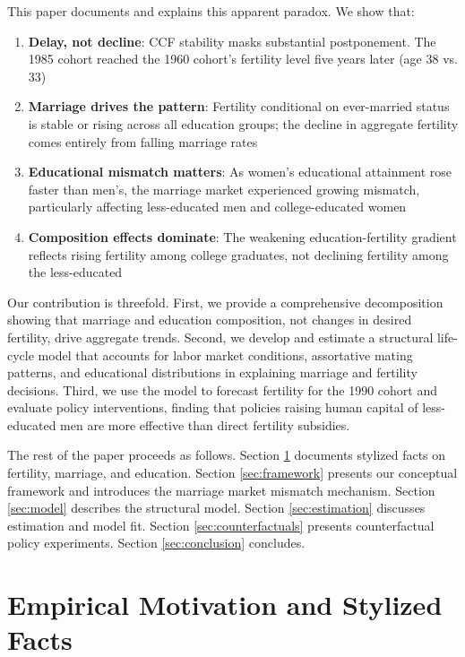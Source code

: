 \documentclass[12pt]{article}
\begin{document}
This paper documents and explains this apparent paradox. We show that:

\begin{enumerate}
    \item \textbf{Delay, not decline}: CCF stability masks substantial postponement. The 1985 cohort reached the 1960 cohort's fertility level five years later (age 38 vs. 33)

    \item \textbf{Marriage drives the pattern}: Fertility conditional on ever-married status is stable or rising across all education groups; the decline in aggregate fertility comes entirely from falling marriage rates

    \item \textbf{Educational mismatch matters}: As women's educational attainment rose faster than men's, the marriage market experienced growing mismatch, particularly affecting less-educated men and college-educated women

    \item \textbf{Composition effects dominate}: The weakening education-fertility gradient reflects rising fertility among college graduates, not declining fertility among the less-educated
\end{enumerate}

Our contribution is threefold. First, we provide a comprehensive decomposition showing that marriage and education composition, not changes in desired fertility, drive aggregate trends. Second, we develop and estimate a structural life-cycle model that accounts for labor market conditions, assortative mating patterns, and educational distributions in explaining marriage and fertility decisions. Third, we use the model to forecast fertility for the 1990 cohort and evaluate policy interventions, finding that policies raising human capital of less-educated men are more effective than direct fertility subsidies.

The rest of the paper proceeds as follows. Section \ref{sec:facts} documents stylized facts on fertility, marriage, and education. Section \ref{sec:framework} presents our conceptual framework and introduces the marriage market mismatch mechanism. Section \ref{sec:model} describes the structural model. Section \ref{sec:estimation} discusses estimation and model fit. Section \ref{sec:counterfactuals} presents counterfactual policy experiments. Section \ref{sec:conclusion} concludes.

\section{Empirical Motivation and Stylized Facts} \label{sec:facts}
\end{document}
